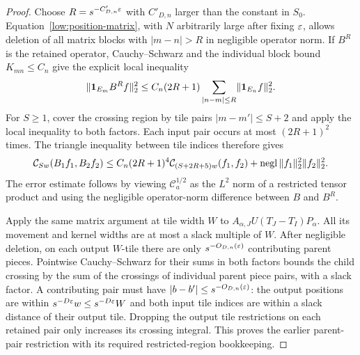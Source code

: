 \begin{proof}
Choose $R=s^{-C'_{D,n}\varepsilon}$ with $C'_{D,n}$ larger than the constant
in $S_0$. Equation~\eqref{low:position-matrix}, with $N$ arbitrarily
large after fixing $\varepsilon$, allows deletion of all matrix blocks with
$|m-n|>R$ in negligible operator norm. If $B^R$ is the retained
operator, Cauchy--Schwarz and the individual block bound $K_{mn}\leq C_n$
give the explicit local inequality
\[
 \lVert \mathbf1_{E_m}B^Rf\rVert_2^2
 \leq C_n(2R+1)\sum_{|n-m|\leq R}
                              \lVert \mathbf1_{E_n}f\rVert_2^2.
\]
For $S\geq1$, cover the crossing region by tile pairs
$|m-m'|\leq S+2$ and apply the local inequality to both factors.
Each input pair occurs at most $(2R+1)^2$ times. The triangle
inequality between tile indices therefore gives
\begin{equation}
 \mathcal C_{Sw}(B_1f_1,B_2f_2)
 \leq C_n(2R+1)^4
        \mathcal C_{(S+2R+5)w}(f_1,f_2)
       +\mathrm{negl}\,\lVert f_1\rVert_2^2\lVert f_2\rVert_2^2.
 \label{low:product-transfer}
\end{equation}
The error estimate follows by viewing $\mathcal C_a^{1/2}$ as the
$L^2$ norm of a restricted tensor product and using the negligible
operator-norm difference between $B$ and $B^R$.

Apply the same matrix argument at tile width $W$ to
$A_{\alpha,J}U(T_J-T_I)P_\alpha$. All its movement and kernel widths
are at most a slack multiple of $W$. After negligible deletion, on
each output $W$-tile there are only $s^{-O_{D,n}(\varepsilon)}$ contributing
parent pieces. Pointwise Cauchy--Schwarz for their sums in both
factors bounds the child crossing by the sum of the crossings of
individual parent piece pairs, with a slack factor. A contributing
pair must have $|b-b'|\leq s^{-O_{D,n}(\varepsilon)}$: the output positions
are within $s^{-D\varepsilon}w\leq s^{-D\varepsilon}W$ and both input tile indices
are within a slack distance of their output tile. Dropping the output
tile restrictions on each retained pair only increases its crossing
integral. This proves the earlier parent-pair restriction with its
required restricted-region bookkeeping.


\end{proof}
